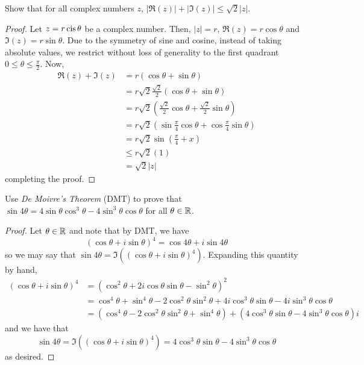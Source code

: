 \documentclass{agony}
\begin{document}
\question Show that for all complex numbers $z$, $|\Re(z)|+|\Im(z)|\leq\sqrt{2}|z|$.
\begin{proof}
  Let $z = r\operatorname{cis} \theta$ be a complex number.
  Then, $|z| = r$, $\Re(z) = r\cos\theta$ and $\Im(z) = r\sin\theta$.
  Due to the symmetry of sine and cosine, instead of taking absolute values,
  we restrict without loss of generality to the first quadrant $0 \leq \theta \leq \frac\pi2$. Now,
  \begin{align*}
    \Re(z) + \Im(z) & = r(\cos\theta + \sin\theta)                                                          \\
                    & = r\sqrt{2}\frac{\sqrt{2}}{2}(\cos\theta + \sin\theta)                                \\
                    & = r\sqrt{2}\left( \frac{\sqrt{2}}{2}\cos\theta + \frac{\sqrt{2}}{2}\sin\theta \right) \\
                    & = r\sqrt{2}\left( \sin\frac\pi4\cos\theta + \cos\frac\pi4\sin\theta \right)           \\
                    & = r\sqrt{2}\sin\left(\frac\pi4 + x\right)                                             \\
                    & \leq r\sqrt{2}(1)                                                                     \\
                    & = \sqrt{2}|z|
  \end{align*}
  completing the proof.
\end{proof}


\question Use \emph{De Moivre's Theorem} (DMT) to prove that
$\sin 4\theta = 4\sin\theta\cos^3\theta - 4\sin^3\theta\cos\theta$ for all $\theta\in\mathbb{R}$.
\begin{proof}
  Let $\theta \in \mathbb{R}$ and note that by DMT, we have
  \[ (\cos\theta + i\sin\theta)^4 = \cos 4\theta + i\sin 4\theta \]
  so we may say that $\sin 4\theta = \Im((\cos\theta + i\sin\theta)^4)$.
  Expanding this quantity by hand,
  \begin{align*}
    (\cos\theta + i\sin\theta)^4
     & = (\cos^2 \theta + 2i\cos\theta\sin\theta - \sin^2\theta)^2                                                        \\
     & = \cos^4\theta + \sin^4\theta - 2\cos^2\theta\sin^2\theta + 4i\cos^3\theta\sin\theta - 4i\sin^3\theta\cos\theta    \\
     & = (\cos^4\theta - 2\cos^2\theta\sin^2\theta + \sin^4\theta) + (4\cos^3\theta\sin\theta - 4\sin^3\theta\cos\theta)i
  \end{align*}
  and we have that
  \[ \sin 4\theta = \Im((\cos\theta + i\sin\theta)^4) = 4\cos^3\theta\sin\theta - 4\sin^3\theta\cos\theta \]
  as desired.
\end{proof}
\end{document}

